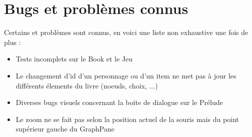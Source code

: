 	\section{Bugs et problèmes connus}

		Certains et problèmes sont connus, en voici une liste non exhaustive une fois de plus :

		\begin{itemize}
			\item{Tests incomplets sur le Book et le Jeu}
			\item{Le changement d'id d'un personnage ou d'un item ne met pas à jour les différents élements du livre (noeuds, choix, ...)}
			\item{Diverses bugs visuels concernant la boite de dialogue sur le Prélude}
			\item{Le zoom ne se fait pas selon la position actuel de la souris mais du point supérieur gauche du GraphPane}
		\end{itemize}
